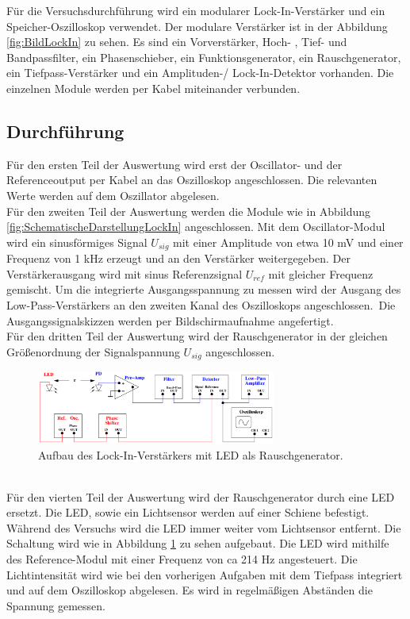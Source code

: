 Für die Versuchsdurchführung wird ein modularer Lock-In-Verstärker und ein Speicher-Oszilloskop verwendet.
Der modulare Verstärker ist in der Abbildung \ref{fig:BildLockIn} zu sehen. Es sind ein Vorverstärker, Hoch-
, Tief- und Bandpassfilter, ein Phasenschieber, ein Funktionsgenerator, ein Rauschgenerator, ein Tiefpass-Verstärker
und ein Amplituden-/ Lock-In-Detektor vorhanden. Die einzelnen Module werden per Kabel miteinander verbunden.

\subsection{Durchführung}
\label{sec:Durchführung}

Für den ersten Teil der Auswertung wird erst der Oscillator- und der Referenceoutput per Kabel an das Oszilloskop angeschlossen. 
Die relevanten Werte werden auf dem Oszillator abgelesen.\\
Für den zweiten Teil der Auswertung werden die Module wie in Abbildung \ref{fig:SchematischeDarstellungLockIn} angeschlossen.
Mit dem Oscillator-Modul wird ein sinusförmiges Signal $U_{sig}$ mit einer Amplitude von etwa 10 mV und einer Frequenz von 1 kHz erzeugt
und an den Verstärker weitergegeben. Der Verstärkerausgang wird mit sinus Referenzsignal $U_{ref}$ mit gleicher Frequenz gemischt.
Um die integrierte Ausgangsspannung zu messen wird der Ausgang des Low-Pass-Verstärkers an den zweiten Kanal des Oszilloskops angeschlossen.\
Die Ausgangssignalskizzen werden per Bildschirmaufnahme angefertigt.\\
Für den dritten Teil der Auswertung wird der Rauschgenerator in der gleichen Größenordnung der Signalspannung $U_{sig}$ angeschlossen.\\
\begin{figure}
    \centering
    \includegraphics[width=0.7\textwidth]{img/LED.png}
    \caption{Aufbau des Lock-In-Verstärkers mit LED als Rauschgenerator.\cite{V303}}
    \label{fig:LED}
\end{figure}
\\
Für den vierten Teil der Auswertung wird der Rauschgenerator durch eine LED ersetzt. 
Die LED, sowie ein Lichtsensor werden auf einer Schiene befestigt. Während des Versuchs wird die LED immer weiter vom 
Lichtsensor entfernt.
Die Schaltung wird wie in Abbildung \ref{fig:LED} zu sehen aufgebaut.
Die LED wird mithilfe des Reference-Modul mit einer Frequenz von ca 214 Hz angesteuert.
Die Lichtintensität wird wie bei den vorherigen Aufgaben mit dem Tiefpass integriert und auf dem Oszilloskop abgelesen.
Es wird in regelmäßigen Abständen die Spannung gemessen.\\